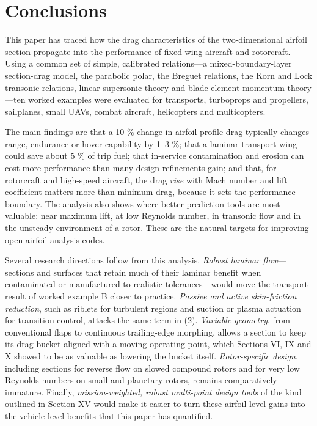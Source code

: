 \documentclass[10pt,a4paper,twocolumn]{article}
\begin{document}
\hypertarget{conclusions}{%
\section{Conclusions}\label{conclusions}}

This paper has traced how the drag characteristics of the
two-dimensional airfoil section propagate into the performance of
fixed-wing aircraft and rotorcraft. Using a common set of simple,
calibrated relations---a mixed-boundary-layer section-drag model, the
parabolic polar, the Breguet relations, the Korn and Lock transonic
relations, linear supersonic theory and blade-element momentum
theory---ten worked examples were evaluated for transports, turboprops
and propellers, sailplanes, small UAVs, combat aircraft, helicopters and
multicopters.

The main findings are that a 10 \% change in airfoil profile drag
typically changes range, endurance or hover capability by 1--3 \%; that
a laminar transport wing could save about 5 \% of trip fuel; that
in-service contamination and erosion can cost more performance than many
design refinements gain; and that, for rotorcraft and high-speed
aircraft, the drag \emph{rise} with Mach number and lift coefficient
matters more than minimum drag, because it sets the performance
boundary. The analysis also shows where better prediction tools are most
valuable: near maximum lift, at low Reynolds number, in transonic flow
and in the unsteady environment of a rotor. These are the natural
targets for improving open airfoil analysis codes.

Several research directions follow from this analysis. \emph{Robust
laminar flow}---sections and surfaces that retain much of their laminar
benefit when contaminated or manufactured to realistic
tolerances---would move the transport result of worked example B closer
to practice. \emph{Passive and active skin-friction reduction}, such as
riblets for turbulent regions and suction or plasma actuation for
transition control, attacks the same term in (2). \emph{Variable
geometry}, from conventional flaps to continuous trailing-edge morphing,
allows a section to keep its drag bucket aligned with a moving operating
point, which Sections VI, IX and X showed to be as valuable as lowering
the bucket itself. \emph{Rotor-specific design}, including sections for
reverse flow on slowed compound rotors and for very low Reynolds numbers
on small and planetary rotors, remains comparatively immature. Finally,
\emph{mission-weighted, robust multi-point design tools} of the kind
outlined in Section XV would make it easier to turn these airfoil-level
gains into the vehicle-level benefits that this paper has quantified.
\end{document}

